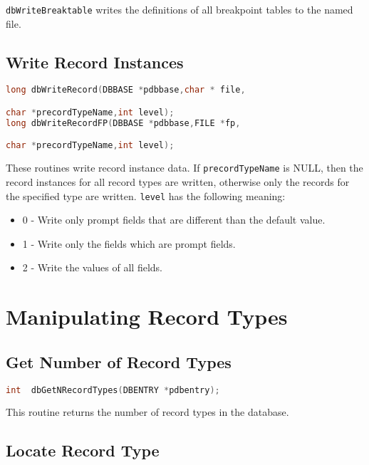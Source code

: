 \verb|dbWriteBreaktable| writes the definitions of all breakpoint tables to the named file.

\subsection{Write Record Instances}

\begin{lstlisting}[language=C]
long dbWriteRecord(DBBASE *pdbbase,char * file,

char *precordTypeName,int level);
long dbWriteRecordFP(DBBASE *pdbbase,FILE *fp,

char *precordTypeName,int level);
\end{lstlisting}

These routines write record instance data.
If \verb|precordTypeName| is NULL, then the record instances for all record types are written, otherwise only the records for the specified type are written.
\verb|level| has the following meaning:

\begin{itemize}
\item 0 - Write only prompt fields that are different than the default value.
\item 1 - Write only the fields which are prompt fields.
\item 2 - Write the values of all fields.
\end{itemize}

\section{Manipulating Record Types}

\subsection{Get Number of Record Types}

\begin{lstlisting}[language=C]
int  dbGetNRecordTypes(DBENTRY *pdbentry);
\end{lstlisting}

This routine returns the number of record types in the database.

\subsection{Locate Record Type}

